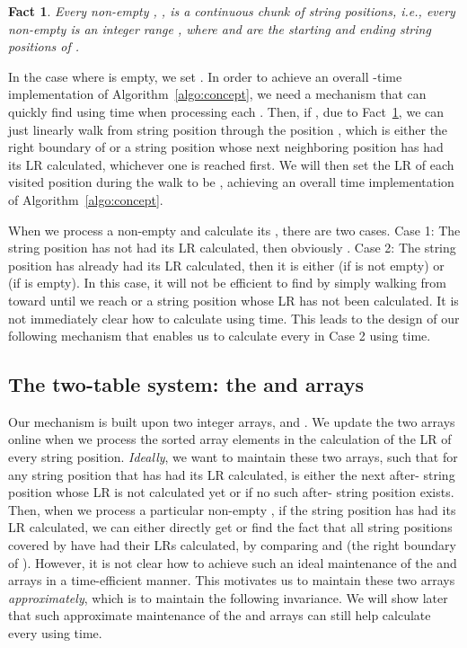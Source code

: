 \documentclass[preprint]{elsarticle}
\newtheorem{definition}{Definition}[section]
\newtheorem{fact}{Fact}[section]
\newcommand{\remove}[1]{}
\begin{document}
\begin{fact}
\label{fact:p}
Every non-empty , , is a continuous chunk of
string positions, i.e., every non-empty  is an integer range ,
where  and  are the starting
and ending string positions of . 
\end{fact}
In the case where  is empty, we set .
In order to achieve an overall -time implementation of
Algorithm~\ref{algo:concept}, we need a mechanism that can quickly
find  using  time when processing each . Then, if
, due to Fact~\ref{fact:p}, we can just linearly walk from
string position  through the position , which is either the
right boundary of  or a string position whose next
neighboring position has had its LR calculated, whichever one
is reached first.  We will then set the LR of each visited position
during the walk to be , achieving an overall  time
implementation of Algorithm~\ref{algo:concept}.

When we process a non-empty  and calculate its , there
are two cases.  Case 1: The string position  has not
had its LR calculated, then obviously .  Case 2:
The string position  has already had its LR
calculated, then it is either  (if  is not
empty) or  (if  is empty). In this case, it will not be
efficient to find  by simply walking from  toward
 until we reach  or a string position whose LR has not been
calculated. It is not immediately clear how to calculate
 using  time. This leads to the design of our following
mechanism that enables us to calculate every  in Case 2 using
 time.




\subsection{The two-table system: the  and  arrays}
\remove{
\begin{definition}
  \label{def:alpha-k}
  For any string position  that has had its LR calculated during
  the run of Algorithm~\ref{algo:concept}, we use  to denote
  the first string position that is after  and has not had its LR
  calculated, if such string position exists; otherwise, we set
  , where  is the length of the string .
\end{definition}
}


Our mechanism is built upon two integer arrays,  and
.  We
update the two arrays online when we process the sorted  array
elements in the calculation of the LR of every string position.
\emph{Ideally}, we want to maintain these two arrays, such that for
any string position  that has had its LR calculated,
 is either the next after- string position
whose LR is not calculated yet or  if no such after- string
position exists.  Then, when we process a particular non-empty
, if the string position  has had its LR
calculated, we can either directly get  or find the fact that all
string positions covered by  have had their LRs calculated,
by comparing  and
 (the right boundary of ).
However, it is not clear how to achieve such an ideal maintenance of
the  and  arrays in a time-efficient manner. This motivates
us to maintain these two arrays \emph{approximately}, which is to
maintain the following invariance. We will show later that such
approximate maintenance of the  and  arrays can still help
calculate every  using  time.
\end{document}
